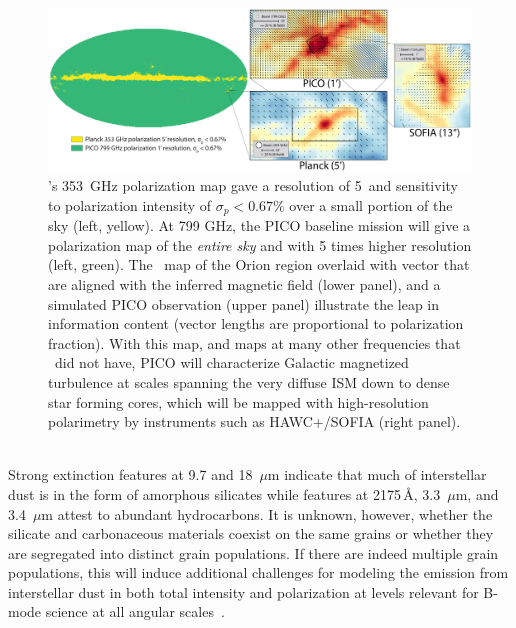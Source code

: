 \documentclass[PICOReport.tex]{subfiles}
\begin{document}
%
%
\begin{figure}
    \centering
    \includegraphics[width=6.5in]{images/galsci_fig_v4.pdf}
    \caption{\small \setlength{\baselineskip}{0.90\baselineskip} \planck 's 353~GHz polarization map gave a resolution of 5\arcmin~and sensitivity to polarization intensity of $\sigma_{p} < 0.67\%$ over a small portion of the sky (left, yellow).  At 799 GHz, the PICO baseline mission will give a polarization map of the {\it entire sky} and with 5 times higher resolution (left, green). The \planck~map of the Orion region overlaid with vector that are aligned with the inferred magnetic field (lower panel), and a simulated PICO observation (upper panel) illustrate the leap in information content (vector lengths are proportional to polarization fraction). With this map, and maps at many other frequencies that \planck~did not have, PICO will characterize Galactic magnetized turbulence at scales spanning the very diffuse ISM down to dense star forming cores, which will be mapped with high-resolution polarimetry by instruments such as HAWC+/SOFIA \citep{Chuss2018} (right panel).}
    \label{fig:allsky}
\end{figure}

 \\
Strong extinction features at 9.7 and 18~$\mu$m indicate that much of interstellar dust is in the form of amorphous silicates while features at 2175\,\AA, 3.3~$\mu$m, and 3.4~$\mu$m attest to abundant hydrocarbons. It is unknown, however, whether the silicate and carbonaceous materials coexist on the same grains or whether they are segregated into distinct grain populations. If there are indeed multiple grain populations, this will induce additional challenges for modeling the emission from interstellar dust in both total intensity and polarization at levels relevant for B-mode science at all angular scales~\citep{Hensley2018}. 
\end{document}
